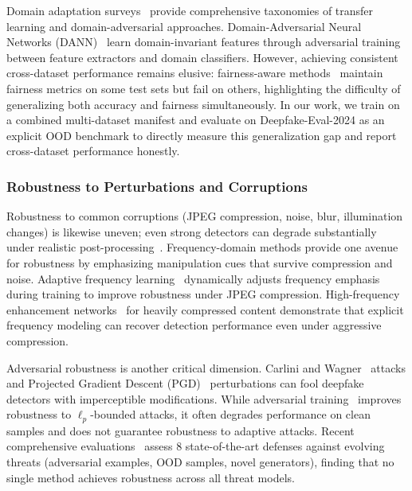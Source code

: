 Domain adaptation surveys~\cite{wang2018deepDA_survey,ganin2016dann} provide comprehensive taxonomies of transfer learning and domain\hyp adversarial approaches. Domain\hyp Adversarial Neural Networks (DANN)~\cite{ganin2016dann} learn domain\hyp invariant features through adversarial training between feature extractors and domain classifiers. However, achieving consistent cross\hyp dataset performance remains elusive: fairness\hyp aware methods~\cite{zhang2024fairness_generalization} maintain fairness metrics on some test sets but fail on others, highlighting the difficulty of generalizing both accuracy and fairness simultaneously. In our work, we train on a combined multi\hyp dataset manifest and evaluate on Deepfake\hyp Eval\hyp 2024 as an explicit OOD benchmark to directly measure this generalization gap and report cross\hyp dataset performance honestly.

\subsubsection*{Robustness to Perturbations and Corruptions}
Robustness to common corruptions (JPEG compression, noise, blur, illumination changes) is likewise uneven; even strong detectors can degrade substantially under realistic post\hyp processing~\cite{durall2020watch,qian2020thinkingfrequency,wang2022afd}. Frequency\hyp domain methods provide one avenue for robustness by emphasizing manipulation cues that survive compression and noise. Adaptive frequency learning~\cite{wang2022afd} dynamically adjusts frequency emphasis during training to improve robustness under JPEG compression. High\hyp frequency enhancement networks~\cite{zhao2024hfen} for heavily compressed content demonstrate that explicit frequency modeling can recover detection performance even under aggressive compression.

Adversarial robustness is another critical dimension. Carlini and Wagner~\cite{carlini2017towards} attacks and Projected Gradient Descent (PGD)~\cite{madry2018towards} perturbations can fool deepfake detectors with imperceptible modifications. While adversarial training~\cite{madry2018towards,goodfellow2015explaining} improves robustness to $\ell_p$-bounded attacks, it often degrades performance on clean samples and does not guarantee robustness to adaptive attacks. Recent comprehensive evaluations~\cite{gandhi2024comprehensive_eval} assess 8 state\hyp of\hyp the\hyp art defenses against evolving threats (adversarial examples, OOD samples, novel generators), finding that no single method achieves robustness across all threat models.

